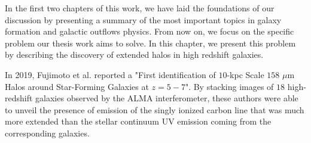 In the first two chapters of this work, we have laid the foundations of our discussion by presenting a summary of the most important topics in galaxy formation and galactic outflows physics. From now on, we focus on the specific problem our thesis work aims to solve. In this chapter, we present this problem by describing the discovery of extended \CII halos in high redshift galaxies. 

In 2019, Fujimoto et al. \citep{Fujimoto19} reported a "First identification of $10$-kpc Scale \CII $158$ $\mu$m Halos around Star-Forming Galaxies at $z=5-7$". By stacking images of $18$ high-redshift galaxies observed by the ALMA interferometer, these authors were able to unveil the presence of emission of the singly ionized carbon line \CII that was much more extended than the stellar continuum UV emission coming from the corresponding galaxies. 


